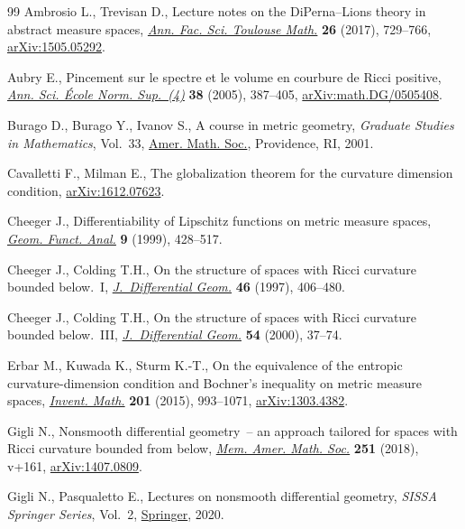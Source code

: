 \documentclass[pdftex]{sigma}
\numberwithin{equation}{section}
\theoremstyle{definition}
\begin{document}
\begin{thebibliography}{99}
Ambrosio L., Trevisan D., Lecture notes on the {D}i{P}erna--{L}ions theory in
 abstract measure spaces, \href{https://doi.org/10.5802/afst.1551}{\textit{Ann. Fac. Sci. Toulouse Math.}} \textbf{26}
 (2017), 729--766, \href{https://arxiv.org/abs/1505.05292}{arXiv:1505.05292}.

Aubry E., Pincement sur le spectre et le volume en courbure de {R}icci
 positive, \href{https://doi.org/10.1016/j.ansens.2005.01.002}{\textit{Ann. Sci. \'Ecole Norm. Sup.~(4)}} \textbf{38} (2005),
 387--405, \href{https://arxiv.org/abs/math.DG/0505408}{arXiv:math.DG/0505408}.

Burago D., Burago Y., Ivanov S., A course in metric geometry, \textit{Graduate
 Studies in Mathematics}, Vol.~33, \href{https://doi.org/10.1090/gsm/033}{Amer. Math. Soc.}, Providence, RI, 2001.

Cavalletti F., Milman E., The globalization theorem for the curvature dimension
 condition, \href{https://arxiv.org/abs/1612.07623}{arXiv:1612.07623}.

Cheeger J., Differentiability of {L}ipschitz functions on metric measure
 spaces, \href{https://doi.org/10.1007/s000390050094}{\textit{Geom. Funct. Anal.}} \textbf{9} (1999), 428--517.

Cheeger J., Colding T.H., On the structure of spaces with {R}icci curvature
 bounded below.~{I}, \href{https://doi.org/10.4310/jdg/1214459974}{\textit{J.~Differential Geom.}} \textbf{46} (1997),
 406--480.

Cheeger J., Colding T.H., On the structure of spaces with {R}icci curvature
 bounded below.~{III}, \href{https://doi.org/10.4310/jdg/1214342146}{\textit{J.~Differential Geom.}} \textbf{54} (2000),
 37--74.

Erbar M., Kuwada K., Sturm K.-T., On the equivalence of the entropic
 curvature-dimension condition and {B}ochner's inequality on metric measure
 spaces, \href{https://doi.org/10.1007/s00222-014-0563-7}{\textit{Invent. Math.}} \textbf{201} (2015), 993--1071,
 \href{https://arxiv.org/abs/1303.4382}{arXiv:1303.4382}.

Gigli N., Nonsmooth differential geometry~-- an approach tailored for spaces
 with {R}icci curvature bounded from below, \href{https://doi.org/10.1090/memo/1196}{\textit{Mem. Amer. Math. Soc.}}
 \textbf{251} (2018), v+161, \href{https://arxiv.org/abs/1407.0809}{arXiv:1407.0809}.

Gigli N., Pasqualetto E., Lectures on nonsmooth differential geometry,
 \textit{SISSA Springer Series}, Vol.~2, \href{https://doi.org/10.1007/978-3-030-38613-9}{Springer}, 2020.


\end{thebibliography}
\end{document}
